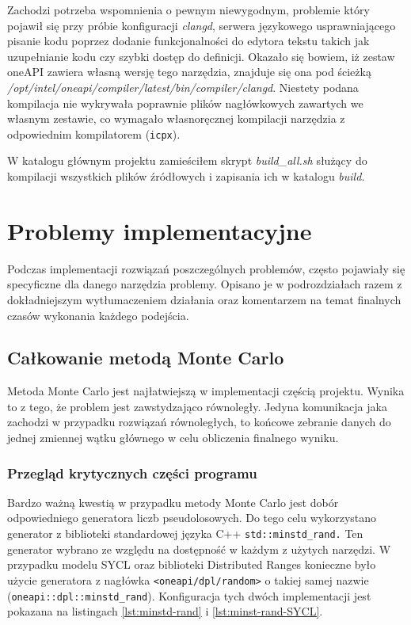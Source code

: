 \documentclass[a4paper,12pt]{book} %
\begin{document}
Zachodzi potrzeba wspomnienia o pewnym niewygodnym, problemie który pojawił się przy próbie konfiguracji \emph{clangd}, serwera językowego usprawniającego pisanie kodu poprzez dodanie funkcjonalności do edytora tekstu takich jak uzupełnianie kodu czy szybki dostęp do definicji. Okazało się bowiem, iż zestaw oneAPI zawiera własną wersję tego narzędzia, znajduje się ona pod ścieżką \emph{/opt/intel/oneapi/compiler/latest/bin/compiler/clangd}. Niestety podana kompilacja nie wykrywała poprawnie plików nagłówkowych zawartych we własnym zestawie, co wymagało własnoręcznej kompilacji narzędzia z odpowiednim kompilatorem (\texttt{icpx}).

W katalogu głównym projektu zamieściłem skrypt \emph{build\_all.sh} służący do kompilacji wszystkich plików źródłowych i zapisania ich w katalogu \emph{build.}

\chapter{Problemy implementacyjne}
Podczas implementacji rozwiązań poszczególnych problemów, często pojawiały się specyficzne dla danego narzędzia problemy. Opisano je w podrozdziałach razem z dokładniejszym wytłumaczeniem działania oraz komentarzem na temat finalnych czasów wykonania każdego podejścia.
\section{Całkowanie metodą Monte Carlo}
Metoda Monte Carlo jest najłatwiejszą w implementacji częścią projektu. Wynika to z tego, że problem jest zawstydzająco równoległy. Jedyna komunikacja jaka zachodzi w przypadku rozwiązań równoległych, to końcowe zebranie danych do jednej zmiennej wątku głównego w celu obliczenia finalnego wyniku.
\subsection{Przegląd krytycznych części programu}
Bardzo ważną kwestią w przypadku metody Monte Carlo jest dobór odpowiedniego generatora liczb pseudolosowych. Do tego celu wykorzystano generator z biblioteki standardowej języka C++ \texttt{std::minstd\_rand.} Ten generator wybrano ze względu na dostępność w każdym z użytych narzędzi. W przypadku modelu SYCL oraz biblioteki Distributed Ranges konieczne było użycie generatora z nagłówka \texttt{<oneapi/dpl/random>} o takiej samej nazwie (\texttt{oneapi::dpl::minstd\_rand}). Konfiguracja tych dwóch implementacji jest pokazana na listingach \ref{lst:minstd-rand} i \ref{lst:minst-rand-SYCL}.
\end{document}
